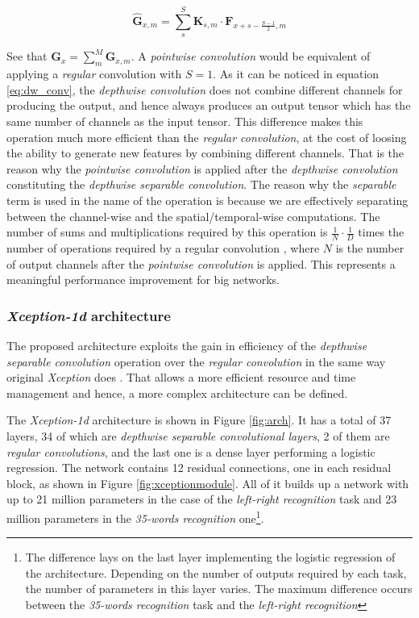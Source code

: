 \documentclass[review]{elsarticle}
\begin{document}
\begin{equation}
\hat{\mathbf{G}}_{x, m} = \sum_{s}^{S} \mathbf{K}_{s, m} \cdot \mathbf{F}_{x+s-\frac{S-1}{2}, m} 
\label{eq:dw_conv}
\end{equation}

See that $\mathbf{G}_{x} =  \sum_{m}^{M} \hat{\mathbf{G}}_{x, m}$. A \textit{pointwise convolution} would be equivalent of applying a \textit{regular} convolution with $S=1$. As it can be noticed in equation \ref{eq:dw_conv}, the \textit{depthwise convolution} does not combine different channels for producing the output, and hence always produces an output tensor which has the same number of channels as the input tensor. This difference makes this operation much more efficient than the \textit{regular convolution}, at the cost of loosing the ability to generate new features by combining different channels. That is the reason why the \textit{pointwise convolution} is applied after the \textit{depthwise convolution} constituting the \textit{depthwise separable convolution}. The reason why the \textit{separable} term is used in the name of the operation is because we are effectively separating between the channel-wise and the spatial/temporal-wise computations. The number of sums and multiplications required by this operation is $\frac{1}{N} \cdot \frac{1}{D}$ times the number of operations required by a regular convolution \cite{Howard2017}, where $N$ is the number of output channels after the \textit{pointwise convolution} is applied. This represents a meaningful performance improvement for big networks.



\subsubsection{\textit{Xception-1d} architecture}
The proposed architecture exploits the gain in efficiency of the \textit{depthwise separable convolution} operation over the \textit{regular convolution} in the same way original \textit{Xception} does \cite{FChollet2017}. That allows a more efficient resource and time management and hence, a more complex architecture can be defined. 

The \textit{Xception-1d} architecture is shown in Figure \ref{fig:arch}. It has a total of 37 layers, 34 of which are \textit{depthwise separable convolutional layers}, 2 of them are \textit{regular convolutions}, and the last one is a dense layer performing a logistic regression. The network contains 12 residual connections, one in each residual block, as shown in Figure \ref{fig:xceptionmodule}. All of it builds up a network with up to 21 million parameters in the case of the \textit{left-right recognition}  task and 23 million parameters in the \textit{35-words recognition} one\footnote{The difference lays on the last layer implementing the logistic regression of the architecture. Depending on the number of outputs required by each task, the number of parameters in this layer varies. The maximum difference occurs between the \textit{35-words recognition} task and the \textit{left-right recognition}}.
\end{document}
